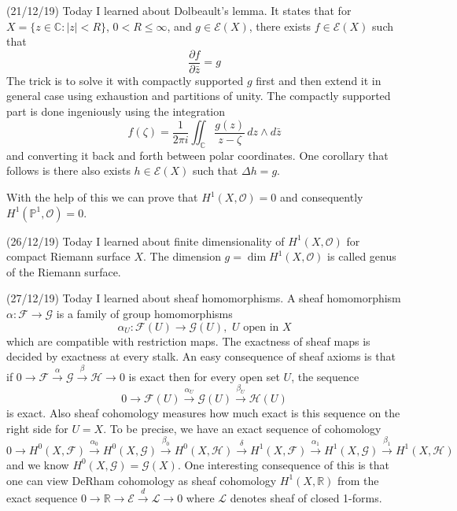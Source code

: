 \documentclass[12pt,a4paper]{article}
\begin{document}
(21/12/19) Today I learned about Dolbeault's lemma. It states that for $X=\{z\in \mathbb{C} : |z| < R\}$, $0 < R \le \infty$, and $g \in \mathcal{E}(X)$, there exists $f\in \mathcal{E}(X)$ such that \[ \frac{\partial f}{\partial \bar{z}} = g \]
The trick is to solve it with compactly supported $g$ first and then extend it in general case using exhaustion and partitions of unity. The compactly supported part is done ingeniously using the integration \[ f(\zeta) = \frac{1}{2\pi i} \iint_{\mathbb{C}}\frac{g(z)}{z-\zeta}\, dz \wedge d \bar{z}  \]
and converting it back and forth between polar coordinates. One corollary that follows is there  also exists $h\in \mathcal{E}(X)$ such that $\Delta h = g$.

With the help of this we can prove that $H^1(X,\mathcal{O})=0$ and consequently $H^1(\mathbb{P}^1, \mathcal{O}) = 0$. 

(26/12/19) Today I learned about finite dimensionality of $H^1(X,\mathcal{O})$ for compact Riemann surface $X$. The dimension $g= \dim H^1(X,\mathcal{O})$ is called genus of the Riemann surface.

(27/12/19) Today I learned about sheaf homomorphisms. A sheaf homomorphism $\alpha : \mathcal{F} \to \mathcal{G} $ is a family of group homomorphisms \[ \alpha_U : \mathcal{F}(U) \to \mathcal{G}(U), \, \, U \text{ open in }X\]which are compatible with restriction maps. The exactness of sheaf maps is decided by exactness at every stalk. An easy consequence of sheaf axioms is that if $0 \to \mathcal{F} \xrightarrow{\alpha} \mathcal{G} \xrightarrow{\beta} \mathcal{H} \to 0$ is exact then for every open set $U$, the sequence \[ 0 \to \mathcal{F}(U) \xrightarrow{\alpha_U} \mathcal{G}(U) \xrightarrow{\beta_U} \mathcal{H}(U) \] is exact.
Also sheaf cohomology measures how much exact is this sequence on the right side for $U=X$. To be precise, we have an exact sequence of cohomology \[  0 \to H^0(X,\mathcal{F}) \xrightarrow{\alpha_0} H^0(X,\mathcal{G}) \xrightarrow{\beta_0} H^0(X,\mathcal{H}) \xrightarrow{\delta} H^1(X,\mathcal{F}) \xrightarrow{\alpha_1} H^1(X,\mathcal{G}) \xrightarrow{\beta_1} H^1(X,\mathcal{H})\]
and we know $H^0(X,\mathcal{G}) = \mathcal{G}(X)$.
One interesting consequence of this is that one can view DeRham cohomology as sheaf cohomology $H^1(X,\mathbb{R})$ from the exact sequence $0 \to \mathbb{R} \to \mathcal{E} \xrightarrow{d} \mathcal{L}\to 0 $ where $\mathcal{L}$ denotes sheaf of closed 1-forms.
\end{document}
